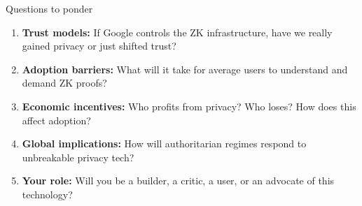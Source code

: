 \documentclass[aspectratio=169, lualatex, handout]{beamer}
\begin{document}
\begin{frame}{Questions to ponder}
	\begin{enumerate}
		\item \textbf{Trust models:} If Google controls the ZK infrastructure, have we really gained privacy or just shifted trust?
		      \vspace{0.5em}
		\item \textbf{Adoption barriers:} What will it take for average users to understand and demand ZK proofs?
		      \vspace{0.5em}
		\item \textbf{Economic incentives:} Who profits from privacy? Who loses? How does this affect adoption?
		      \vspace{0.5em}
		\item \textbf{Global implications:} How will authoritarian regimes respond to unbreakable privacy tech?
		      \vspace{0.5em}
		\item \textbf{Your role:} Will you be a builder, a critic, a user, or an advocate of this technology?
	\end{enumerate}
\end{frame}

\begin{frame}[plain]
	\titlepage
\end{frame}
\end{document}
